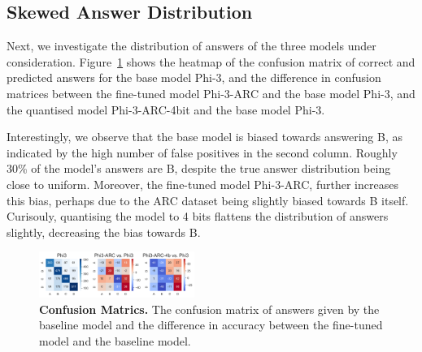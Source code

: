 \subsection{Skewed Answer Distribution}
\label{subsec:answer-distribution}

Next, we investigate the distribution of answers of the three models under
consideration. Figure~\ref{fig:mmlu-answer-distribution} shows the heatmap of
the confusion matrix of correct and predicted answers for the base model Phi-3,
and the difference in confusion matrices between the fine-tuned model Phi-3-ARC
and the base model Phi-3, and the quantised model Phi-3-ARC-4bit and the base
model Phi-3. 

Interestingly, we observe that the base model is biased towards answering B, as
indicated by the high number of false positives in the second column. Roughly
30\% of the model's answers are B, despite the true answer distribution being
close to uniform. Moreover, the fine-tuned model Phi-3-ARC, further increases
this bias, perhaps due to the ARC dataset being slightly biased towards B itself. 
Curisouly, quantising the model to 4 bits flattens the distribution
of answers slightly, decreasing the bias towards B.

\begin{figure}
    \centering
    \includegraphics[width=0.45\textwidth]{figures/mmlu-confusion.png}
    \caption{\textbf{
        Confusion Matrics.}
        The confusion matrix of answers given by the baseline model and the difference in accuracy between the fine-tuned model and the baseline model.
    }
    \label{fig:mmlu-answer-distribution}
\end{figure}